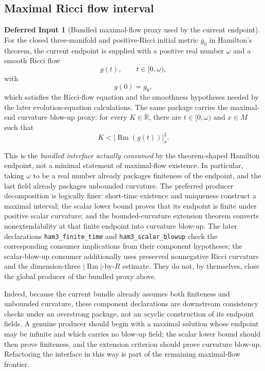 \documentclass[11pt]{article}
\theoremstyle{plain}
\theoremstyle{definition}
\newtheorem{deferred}[theorem]{Deferred Input}
\theoremstyle{remark}
\newcommand{\Rm}{\operatorname{Rm}}
\newcommand{\norm}[1]{\left|#1\right|}
\newcommand{\leanref}[1]{\nolinkurl{#1}}
\begin{document}
\subsection{Maximal Ricci flow interval}

\begin{deferred}[Bundled maximal-flow proxy used by the current endpoint]
\label{bb:maximal-rf-interval}
For the closed three-manifold and positive-Ricci initial metric \(g_0\) in
Hamilton's theorem, the current endpoint is supplied with a positive real number
\(\omega\) and a smooth Ricci flow
\[
  g(t),\qquad t\in[0,\omega),
\]
with
\[
  g(0)=g_0,
\]
which satisfies the Ricci-flow equation and the smoothness hypotheses needed by
the later evolution-equation calculations.  The same package carries the
maximal-end curvature blow-up proxy: for every \(K\in\mathbb R\), there are
\(t\in[0,\omega)\) and \(x\in M\) such that
\[
  K<\norm{\Rm(g(t))}^{2}_{x}.
\]
\end{deferred}

This is the \emph{bundled interface actually consumed} by the theorem-shaped
Hamilton endpoint, not a minimal statement of maximal-flow existence.  In
particular, taking \(\omega\) to be a real number already packages finiteness of
the endpoint, and the last field already packages unbounded curvature.  The
preferred producer decomposition is logically finer: short-time existence and
uniqueness construct a maximal interval; the scalar lower bound proves that its
endpoint is finite under positive scalar curvature; and the bounded-curvature
extension theorem converts nonextendability at that finite endpoint into
curvature blow-up.  The later declarations \leanref{ham3_finite_time} and
\leanref{ham3_scalar_blowup} check the corresponding consumer implications from
their component hypotheses; the scalar-blow-up consumer additionally uses
preserved nonnegative Ricci curvature and the dimension-three
\(\norm{\Rm}\)-by-\(R\) estimate.  They do not, by themselves, close the
global producer of the bundled proxy above.

Indeed, because the current bundle already assumes both finiteness and
unbounded curvature, these component declarations are downstream consistency
checks under an overstrong package, not an acyclic construction of its endpoint
fields.  A genuine producer should begin with a maximal solution whose endpoint
may be infinite and which carries no blow-up field; the scalar lower bound
should then prove finiteness, and the extension criterion should prove
curvature blow-up.  Refactoring the interface in this way is part of the
remaining maximal-flow frontier.
\end{document}
